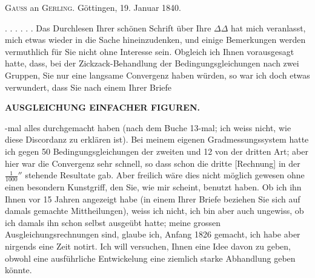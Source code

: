 \bigskip
{\centering
\textsc{Gauss} an \textsc{Gerling}. \quad Göttingen, 19. Januar 1840.\par}
\medskip

. . . . . . Das Durchlesen Ihrer schönen Schrift über Ihre \(\Delta\Delta\) hat mich veranlasst, mich etwas wieder in die Sache hineinzudenken, und einige Bemerkungen werden vermuthlich für Sie nicht ohne Interesse sein. Obgleich ich Ihnen vorausgesagt hatte, dass, bei der Zickzack-Behandlung der Bedingungsgleichungen nach zwei Gruppen, Sie nur eine langsame Convergenz haben würden, so war ich doch etwas verwundert, dass Sie nach einem Ihrer Briefe

\par\clearpage
\noindent\null\hfill{\small\textbf{AUSGLEICHUNG EINFACHER FIGUREN.}}\hfill{}\par\medskip

-mal alles durchgemacht haben (nach dem Buche 13-mal; ich weiss nicht, wie diese Discordanz zu erklären ist). Bei meinem eigenen Gradmessungssystem hatte ich gegen 50 Bedingungsgleichungen der zweiten und 12 von der dritten Art; aber hier war die Convergenz sehr schnell, so dass schon die dritte [Rechnung] in der \(\frac{1}{1000}''\) stehende Resultate gab. Aber freilich wäre dies nicht möglich gewesen ohne einen besondern Kunstgriff, den Sie, wie mir scheint,  benutzt haben. Ob ich ihn Ihnen vor 15 Jahren angezeigt habe (in einem Ihrer Briefe beziehen Sie sich auf damals gemachte Mittheilungen), weiss ich nicht, ich bin aber auch ungewiss, ob ich damals ihn schon selbst ausgeübt hatte; meine grossen Ausgleichungsrechnungen sind, glaube ich, Anfang 1826 gemacht, ich habe aber nirgends eine Zeit notirt. Ich will versuchen, Ihnen eine Idee davon zu geben, obwohl eine ausführliche Entwickelung eine ziemlich starke Abhandlung geben könnte.

